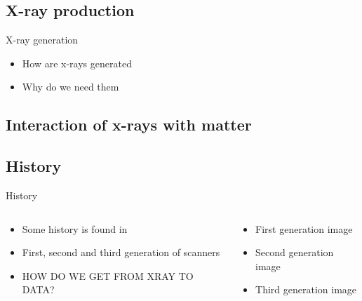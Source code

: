 \documentclass[aspectratio=169,10pt,draft]{beamer}
\begin{document}
\subsection{X-ray production}
\begin{frame}{X-ray generation}
	\begin{itemize}
		\item How are x-rays generated
		\item Why do we need them
	\end{itemize}
\end{frame}

\subsection{Interaction of x-rays with matter}

\subsection{History}
\begin{frame}{History}
	\begin{columns}
		\begin{column}{0.5\linewidth}
			\begin{itemize}
				\item<1-> Some history is found in~\cite{Cormack1963a}
				\item<2-> First, second and third generation of scanners
				\item<5> HOW DO WE GET FROM XRAY TO DATA?
			\end{itemize}
		\end{column}
		\begin{column}{0.5\linewidth}
			\begin{itemize}
				\item<2> First generation image
				\item<3> Second generation image
				\item<4> Third generation image
			\end{itemize}
		\end{column}
	\end{columns}
\end{frame}
\end{document}
